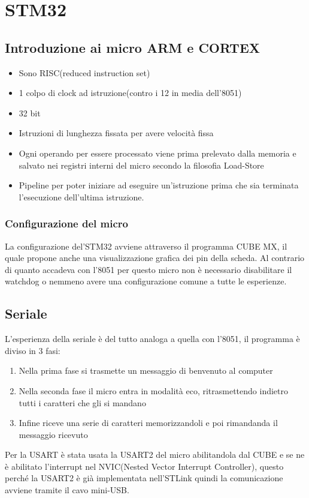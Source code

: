 \documentclass[main.tex]{subfiles}
\begin{document}
\chapter{STM32}
\section{Introduzione ai micro ARM e CORTEX}
\begin{itemize}
    \item Sono RISC(reduced instruction set)
    \item 1 colpo di clock ad istruzione(contro i 12 in media dell'8051)
    \item 32 bit
    \item Istruzioni di lunghezza fissata per avere velocità fissa
    \item Ogni operando per essere processato viene prima prelevato dalla memoria e salvato nei registri interni del micro secondo la filosofia Load-Store
    \item Pipeline per poter iniziare ad eseguire un'istruzione prima che sia terminata l'esecuzione dell'ultima istruzione.
\end{itemize}
\subsection{Configurazione del micro}
La configurazione del'STM32 avviene attraverso il programma CUBE MX, il quale propone anche una visualizzazione grafica dei pin della scheda. Al contrario di quanto accadeva con l'8051 per questo micro non è necessario disabilitare il watchdog o nemmeno avere una configurazione comune a tutte le esperienze.

\section{Seriale}

L'esperienza della seriale è del tutto analoga a quella con l'8051, il programma è diviso in 3 fasi:
\begin{enumerate}
    \item Nella prima fase si trasmette un messaggio di benvenuto al computer
    \item Nella seconda fase il micro entra in modalità eco, ritrasmettendo indietro tutti i caratteri che gli si mandano
    \item Infine riceve una serie di caratteri memorizzandoli e poi rimandanda il messaggio ricevuto
\end{enumerate}
Per la USART è stata usata la USART2 del micro abilitandola dal CUBE e se ne è abilitato l'interrupt nel NVIC(Nested Vector Interrupt Controller), questo perché la USART2 è già implementata nell'STLink quindi la comunicazione avviene tramite il cavo mini-USB. 
\end{document}
